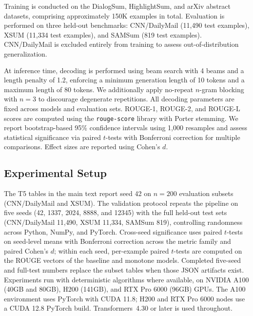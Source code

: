 \documentclass{article}
\theoremstyle{plain}
\theoremstyle{definition}
\theoremstyle{remark}
\begin{document}
Training is conducted on the DialogSum, HighlightSum, and arXiv abstract datasets, comprising approximately 150K examples in total. Evaluation is performed on three held-out benchmarks: CNN/DailyMail (11{,}490 test examples), XSUM (11{,}334 test examples), and SAMSum (819 test examples). CNN/DailyMail is excluded entirely from training to assess out-of-distribution generalization.

At inference time, decoding is performed using beam search with 4 beams and a length penalty of 1.2, enforcing a minimum generation length of 10 tokens and a maximum length of 80 tokens. We additionally apply no-repeat $n$-gram blocking with $n=3$ to discourage degenerate repetitions. All decoding parameters are fixed across models and evaluation sets. ROUGE-1, ROUGE-2, and ROUGE-L scores are computed using the \texttt{rouge-score} library with Porter stemming. We report bootstrap-based 95\% confidence intervals using 1{,}000 resamples and assess statistical significance via paired $t$-tests with Bonferroni correction for multiple comparisons. Effect sizes are reported using Cohen's $d$.

\subsection{Experimental Setup}
The T5 tables in the main text report seed 42 on $n=200$ evaluation subsets (CNN/DailyMail and XSUM). The validation protocol repeats the pipeline on five seeds (42, 1337, 2024, 8888, and 12345) with the full held-out test sets (CNN/DailyMail 11{,}490, XSUM 11{,}334, SAMSum 819), controlling randomness across Python, NumPy, and PyTorch. Cross-seed significance uses paired $t$-tests on seed-level means with Bonferroni correction across the metric family and paired Cohen's $d$; within each seed, per-example paired $t$-tests are computed on the ROUGE vectors of the baseline and monotone models. Completed five-seed and full-test numbers replace the subset tables when those JSON artifacts exist. Experiments run with deterministic algorithms where available, on NVIDIA A100 (40GB and 80GB), H200 (141GB), and RTX Pro 6000 (96GB) GPUs. The A100 environment uses PyTorch with CUDA 11.8; H200 and RTX Pro 6000 nodes use a CUDA 12.8 PyTorch build. Transformers~4.30 or later is used throughout.
\end{document}
